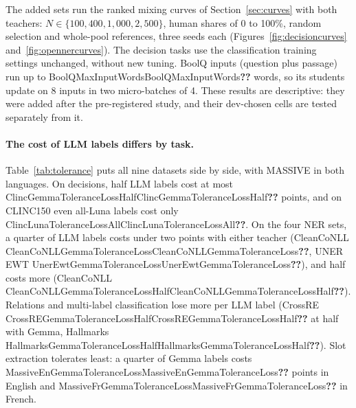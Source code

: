 \documentclass[11pt]{article}
\newcommand{\res}[1]{\ifcsname #1\endcsname\csname #1\endcsname\else\textbf{??}\fi}
\begin{document}
\begin{table}[t]
\centering
\small

\caption{Teacher errors on test, in \% of ground-truth spans: exact match, wrong edges (same type), wrong type (same edges), both wrong, missed. Invented: teacher spans that overlap no ground-truth span, in \% of ground-truth spans. Empty: share of sentences without ground-truth spans to which the teacher adds one.}
\label{tab:teachererrors}
\end{table}

The added sets run the ranked mixing curves of Section~\ref{sec:curves} with both teachers: $N \in \{100, 400, 1{,}000, 2{,}500\}$, human shares of 0 to 100\%, random selection and whole-pool references, three seeds each (Figures~\ref{fig:decisioncurves} and~\ref{fig:opennercurves}). The decision tasks use the classification training settings unchanged, without new tuning. BoolQ inputs (question plus passage) run up to \res{BoolQMaxInputWords} words, so its students update on 8 inputs in two micro-batches of 4. These results are descriptive: they were added after the pre-registered study, and their dev-chosen cells are tested separately from it.

\paragraph{The cost of LLM labels differs by task.} Table~\ref{tab:tolerance} puts all nine datasets side by side, with MASSIVE in both languages. On decisions, half LLM labels cost at most \res{ClincGemmaToleranceLossHalf} points, and on CLINC150 even all-Luna labels cost only \res{ClincLunaToleranceLossAll}. On the four NER sets, a quarter of LLM labels costs under two points with either teacher (CleanCoNLL \res{CleanCoNLLGemmaToleranceLoss}, UNER EWT \res{UnerEwtGemmaToleranceLoss}), and half costs more (CleanCoNLL \res{CleanCoNLLGemmaToleranceLossHalf}). Relations and multi-label classification lose more per LLM label (CrossRE \res{CrossREGemmaToleranceLossHalf} at half with Gemma, Hallmarks \res{HallmarksGemmaToleranceLossHalf}). Slot extraction tolerates least: a quarter of Gemma labels costs \res{MassiveEnGemmaToleranceLoss} points in English and \res{MassiveFrGemmaToleranceLoss} in French.
\end{document}
